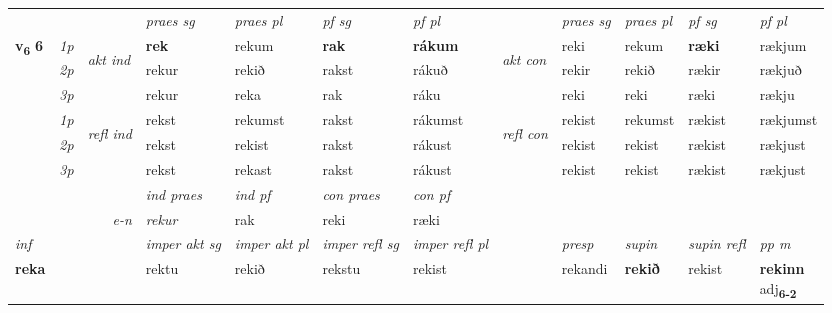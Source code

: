 \begin{longtable}[l]{X>{\footnotesize\itshape}llXXXXlXXXX}
\midrule

 & &   & \textit{praes sg}  & \textit{praes pl}    & \textit{ pf sg} & \textit{pf pl} & & \textit{praes sg}  & \textit{praes pl}    & \textit{pf sg} & \textit{pf pl }  \\ \cmidrule{4-7} \cmidrule{9-12}
 \multirow{2}{*}{{{\textbf{v{\textsubscript{6}}} \Large{\textbf{6}}}}}  & 1p & \multirow{3}{*}{\begin{turn}{90}\textit{akt ind}\end{turn}} & \textbf{rek} & rekum & \textbf{rak} & \textbf{rákum} & \multirow{3}{*}{\begin{turn}{90}\textit{akt con}\end{turn}} &reki & rekum & \textbf{ræki} & rækjum\\*
 & 2p &  &  rekur  & rekið & rakst & rákuð & & rekir & rekið & rækir & rækjuð \\*
 & 3p &  & rekur & reka & rak & ráku & & reki & reki& ræki & rækju \\*
\cmidrule{4-7} \cmidrule{9-12}
 & 1p & \multirow{3}{*}{\begin{turn}{90}\textit{refl ind}\end{turn}}  & rekst & rekumst & rakst & rákumst & \multirow{3}{*}{\begin{turn}{90}\textit{refl con}\end{turn}}  &rekist & rekumst & rækist & rækjumst \\*
 & 2p &  & rekst & rekist & rakst & rákust & &rekist & rekist & rækist & rækjust \\*
 & 3p  & & rekst & rekast & rakst & rákust & & rekist & rekist& rækist & rækjust \\*
\cmidrule{4-7} \cmidrule{9-12}

   && &  \textit{ind praes} & \textit{ind pf} & \textit{con praes} & \textit{con pf} \\*
\multicolumn{3}{r}{\textit{e-n}} & rekur & rak & reki & ræki \\*

\cmidrule{4-7}
   {\textit{inf}} & &  & \textit{imper akt sg} & \textit{imper akt pl} & \textit{imper refl sg} & \textit{imper refl pl} && \textit{presp} & \textit{supin} & \textit{supin refl} & \textit{pp m} \\*
  {\textbf{reka}} & && rektu  & rekið & rekstu & rekist && rekandi &  \textbf{rekið} & rekist & \specialcell{\textbf{rekinn} \\ adj\textbf{\textsubscript{6-2}}} \\*


\end{longtable}
